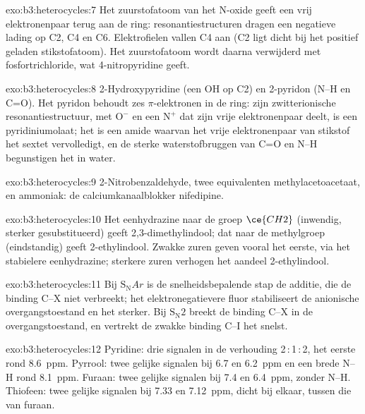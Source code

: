 \begin{solution}{exo:b3:heterocycles:7}
Het zuurstofatoom van het N-oxide geeft een vrij elektronenpaar terug aan
de ring: resonantiestructuren dragen een negatieve lading op C2, C4 en
C6. Elektrofielen vallen C4 aan (C2 ligt dicht bij het positief geladen
stikstofatoom). Het zuurstofatoom wordt daarna verwijderd met
fosfortrichloride, wat 4-nitropyridine geeft.
\end{solution}

\begin{solution}{exo:b3:heterocycles:8}
2-Hydroxypyridine (een OH op C2) en 2-pyridon (N--H en C=O). Het pyridon behoudt zes
$\pi$-elektronen in de ring: zijn zwitterionische resonantiestructuur, met $\mathrm{O^-}$ en een
$\mathrm{N^+}$ dat zijn vrije elektronenpaar deelt, is een pyridiniumolaat; het is een amide waarvan
het vrije elektronenpaar van stikstof het sextet vervolledigt, en de
sterke waterstofbruggen van C=O en N--H begunstigen het in water.
\end{solution}

\begin{solution}{exo:b3:heterocycles:9}
2-Nitrobenzaldehyde, twee equivalenten methylacetoacetaat, en ammoniak:
de calciumkanaalblokker nifedipine.
\end{solution}

\begin{solution}{exo:b3:heterocycles:10}
Het eenhydrazine naar de groep $\ce{CH2}$ (inwendig, sterker gesubstitueerd) geeft
2,3-dimethylindool; dat naar de methylgroep (eindstandig) geeft
2-ethylindool. Zwakke zuren geven vooral het eerste, via het stabielere
eenhydrazine; sterkere zuren verhogen het aandeel 2-ethylindool.
\end{solution}

\begin{solution}{exo:b3:heterocycles:11}
Bij $\mathrm S_\mathrm NAr$ is de snelheidsbepalende stap de additie, die de binding C--X
niet verbreekt; het elektronegatievere fluor stabiliseert de anionische
overgangstoestand en het  sterker. Bij $\mathrm S_\mathrm N2$ breekt de binding C--X in de
overgangstoestand, en vertrekt de zwakke binding C--I het snelst.
\end{solution}

\begin{solution}{exo:b3:heterocycles:12}
Pyridine: drie signalen in de verhouding 2\,:\,1\,:\,2, het eerste rond \qty{8.6}{ppm}. Pyrrool: twee gelijke
signalen bij 6.7 en \qty{6.2}{ppm} en een brede N--H rond \qty{8.1}{ppm}. Furaan: twee gelijke signalen bij
7.4 en \qty{6.4}{ppm}, zonder N--H. Thiofeen: twee gelijke signalen bij 7.33 en \qty{7.12}{ppm}, dicht
bij elkaar, tussen die van furaan.
\end{solution}

